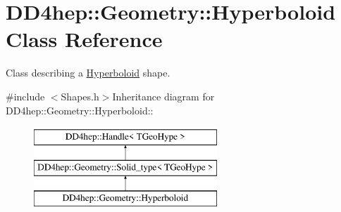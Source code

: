 \hypertarget{class_d_d4hep_1_1_geometry_1_1_hyperboloid}{
\section{DD4hep::Geometry::Hyperboloid Class Reference}
\label{class_d_d4hep_1_1_geometry_1_1_hyperboloid}
}


Class describing a \hyperlink{class_d_d4hep_1_1_geometry_1_1_hyperboloid}{Hyperboloid} shape.  


{\ttfamily \#include $<$Shapes.h$>$}Inheritance diagram for DD4hep::Geometry::Hyperboloid::\begin{figure}[H]
\begin{center}
\leavevmode
\includegraphics[height=3cm]{class_d_d4hep_1_1_geometry_1_1_hyperboloid}
\end{center}
\end{figure}

